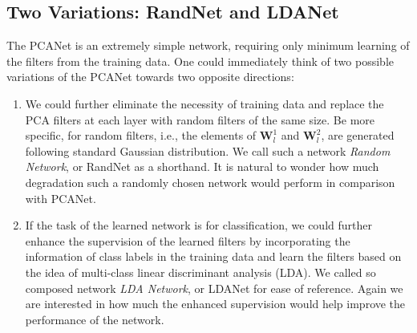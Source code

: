 \documentclass[10pt,journal,compsoc]{IEEEtran}
\begin{document}
\subsection{Two Variations: RandNet and LDANet}\label{sec: Extensions}
The PCANet is an extremely simple network, requiring only minimum learning of the filters from the training data. One could immediately think of two possible variations of the PCANet towards two opposite directions:
\begin{enumerate}
\item We could further eliminate the necessity of training data and replace the PCA filters at each layer with random filters of the same size. Be more specific, for random filters, i.e., the elements of $\bm{W}^1_l$ and $\bm{W}^2_l$, are generated following standard Gaussian distribution. We call such a network {\em Random Network}, or RandNet as a shorthand. It is natural to wonder how much degradation such a randomly chosen network would perform in comparison with PCANet.
\item If the task of the learned network is for classification, we could further enhance the supervision of the learned filters by incorporating the information of class labels in the training data and learn the filters based on the idea of multi-class linear discriminant analysis (LDA). We called so composed network {\em LDA Network}, or LDANet for ease of reference. Again we are interested in how much the enhanced supervision would help improve the performance of the network.
\end{enumerate}
\end{document}
